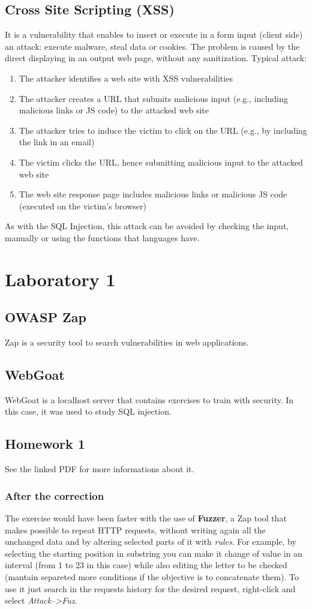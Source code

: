 \documentclass[a4paper, 10pt, titlepage]{article}
\begin{document}
	\subsection*{Cross Site Scripting (XSS)}
	It is a vulnerability that enables to insert or execute in a form input (client side) an attack: execute malware, steal data or cookies. The problem is caused by the direct displaying in an output web page, without any sanitization.
	Typical attack:
	\begin{enumerate}
\item The attacker identifies a web site with XSS vulnerabilities
\item The attacker creates a URL that submits malicious input (e.g.,
including malicious links or JS code) to the attacked web site
\item The attacker tries to induce the victim to click on the URL (e.g., by including the link in an email)
\item The victim clicks the URL, hence submitting malicious input to
the attacked web site
\item The web site response page includes malicious links or
malicious JS code (executed on the victim’s browser)
	\end{enumerate}
	As with the SQL Injection, this attack can be avoided by checking the input, manually or using the functions that languages have.	
	
	\newpage
	\section{Laboratory 1}
	\subsection{OWASP Zap}
	Zap is a security tool to search vulnerabilities in web applications.
	\subsection{WebGoat}
	WebGoat is a localhost server that contains exercises to train with security. In this case, it was used to study SQL injection.
	\subsection{Homework 1}
	See the linked PDF for more informations about it. 
	\subsubsection{After the correction} 
	The exercise would have been faster with the use of \textbf{Fuzzer}, a Zap tool that makes possible to repeat HTTP requests, without writing again all the unchanged data and by altering selected parts of it with \textit{rules}. For example, by selecting the starting position in substring you can make it change of value in an interval (from 1 to 23 in this case) while also editing the letter to be checked (mantain separeted more conditions if the objective is to concatenate them). To use it just search in the requests history for the desired request, right-click and select \textit{Attack-->Fuz}.
	\newpage
	
\end{document}
